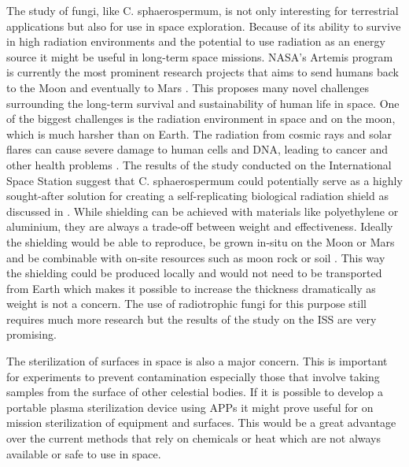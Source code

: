 The study of fungi, like C. sphaerospermum, is not only interesting for terrestrial applications but also for use in space exploration. Because of its ability to survive in high radiation environments and the potential to use radiation as an energy source it might be useful in long-term space missions. NASA's Artemis program is currently the most prominent research projects that aims to send humans back to the Moon and eventually to Mars \cite{artemis}. This proposes many novel challenges surrounding the long-term survival and sustainability of human life in space. One of the biggest challenges is the radiation environment in space and on the moon, which is much harsher than on Earth. The radiation from cosmic rays and solar flares can cause severe damage to human cells and DNA, leading to cancer and other health problems \cite{shield}. The results of the study conducted on the International Space Station \cite{iss} suggest that C. sphaerospermum could potentially serve as a highly sought-after solution for creating a self-replicating biological radiation shield as discussed in \cite{shield}. While shielding can be achieved with materials like polyethylene or aluminium, they are always a trade-off between weight and effectiveness. Ideally the shielding would be able to reproduce, be grown in-situ on the Moon or Mars and be combinable with on-site resources such as moon rock or soil \cite{shield}. This way the shielding could be produced locally and would not need to be transported from Earth which makes it possible to increase the thickness dramatically as weight is not a concern. The use of radiotrophic fungi for this purpose still requires much more research but the results of the study on the ISS are very promising.

The sterilization of surfaces in space is also a major concern. This is important for experiments to prevent contamination especially those that involve taking samples from the surface of other celestial bodies. If it is possible to develop a portable plasma sterilization device using APPs it might prove useful for on mission sterilization of equipment and surfaces. This would be a great advantage over the current methods that rely on chemicals or heat which are not always available or safe to use in space.

